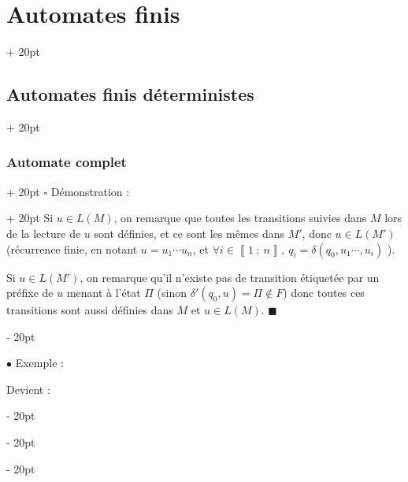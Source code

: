 \documentclass[a4paper, 12pt, twoside]{article}
\newcommand{\nset}[2]{\left\llbracket #1\ ;\ #2 \right\rrbracket}
\newcommand{\ind}[1][20pt]{\advance\leftskip + #1}
\newcommand{\deind}[1][20pt]{\advance\leftskip - #1}
\newenvironment{indt}[2][20pt]{#2 \par \ind[#1]}{\par \deind} %
\newenvironment{proof}[1][{Démonstration :}]{\begin{indt}{$\square$ #1}}{$\blacksquare$ \end{indt}}
\begin{document}
\begin{indt}{\section{Automates finis}}
\begin{indt}{\subsection{Automates finis déterministes}}
\begin{indt}{\subsubsection{Automate complet}}
\begin{proof}
                    Si $u \in L(M)$, on remarque que toutes les transitions suivies dans $M$ lors de la lecture de $u$ sont définies, et ce sont les mêmes dans $M'$, donc $u \in L(M')$ (récurrence finie, en notant $u = u_1 \cdots u_n$, et $\forall i \in \nset 1 n,\ q_i = \delta(q_0, u_1 \cdots, u_i)$ ).

                    \vspace{6pt}
                    
                    Si $u \in L(M')$, on remarque qu'il n'existe pas de transition étiquetée par un préfixe de $u$ menant à l'état $\Pi$ (sinon $\delta'(q_0, u) = \Pi \notin F$) donc toutes ces transitions sont aussi définies dans $M$ et $u \in L(M)$.
                \end{proof}

                \vspace{12pt}
                
                $\bullet$ Exemple :

                \begin{center}
                \end{center}

                Devient :
                \begin{center}
\end{center}
\end{indt}
\end{indt}
\end{indt}
\end{document}
